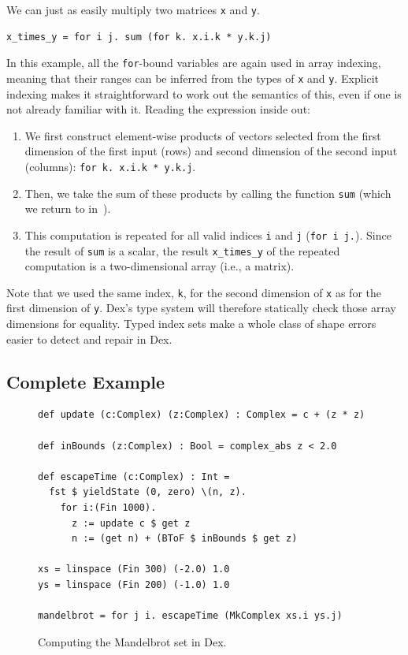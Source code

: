 \documentclass[acmsmall,screen,nonacm]{acmart}
\newlength{\codeindent}
\newcommand{\codelinesize}{\normalsize}
\begin{document}
We can just as easily multiply two matrices \texttt{x} and \texttt{y}.
\begin{Verbatim}[xleftmargin=\codeindent,fontsize=\codelinesize]
x_times_y = for i j. sum (for k. x.i.k * y.k.j)
\end{Verbatim}
In this example, all the \texttt{for}-bound variables are again used in array indexing, meaning that their ranges can be inferred from the types of \texttt{x} and \texttt{y}.
Explicit indexing makes it straightforward to work out the semantics of this, even if one is not already familiar with it.
Reading the expression inside out:
\begin{enumerate}
  \item We first construct element-wise products of vectors selected from the first dimension of the first input (rows) and second dimension of the second input (columns): \texttt{for k. x.i.k * y.k.j}.
  \item Then, we take the sum of these products by calling the function \texttt{sum} (which we return
  to in~).
  \item This computation is repeated for all valid indices \texttt{i} and \texttt{j} (\texttt{for i j.}). Since the result of \texttt{sum} is a scalar, the result \verb|x_times_y| of the repeated computation is a two-dimensional array (i.e., a matrix).
\end{enumerate}

Note that we used the same index, \texttt{k}, for the second dimension of \texttt{x} as for the first dimension of \texttt{y}.
Dex's type system will therefore statically check those array dimensions for equality.
Typed index sets make a whole class of shape errors easier to detect and repair in Dex.

\subsection{Complete Example}
\label{sec:mandelbrot}

\begin{figure}
\begin{Verbatim}[xleftmargin=2cm,fontsize=\small]
def update (c:Complex) (z:Complex) : Complex = c + (z * z)

def inBounds (z:Complex) : Bool = complex_abs z < 2.0

def escapeTime (c:Complex) : Int =
  fst $ yieldState (0, zero) \(n, z).
    for i:(Fin 1000).
      z := update c $ get z
      n := (get n) + (BToF $ inBounds $ get z)

xs = linspace (Fin 300) (-2.0) 1.0
ys = linspace (Fin 200) (-1.0) 1.0

mandelbrot = for j i. escapeTime (MkComplex xs.i ys.j)
\end{Verbatim}
\caption{Computing the Mandelbrot set in Dex.}
\label{fig:mandelbrot}
\end{figure}
\end{document}
